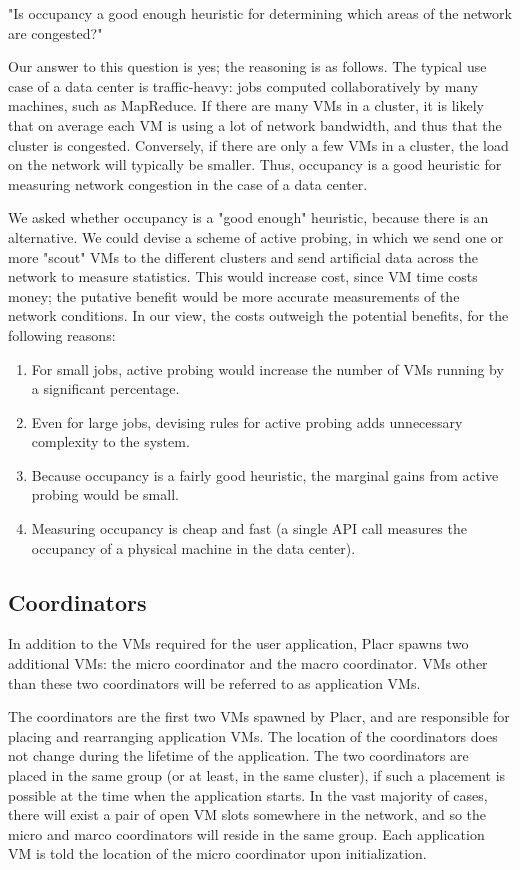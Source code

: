 \documentclass[11pt]{article}
\begin{document}
"Is occupancy a good enough heuristic for determining which areas of the network are congested?"

Our answer to this question is yes; the reasoning is as follows.  The typical use case of a data center is traffic-heavy: jobs computed collaboratively by many machines, such as MapReduce.  If there are many VMs in a cluster, it is likely that on average each VM is using a lot of network bandwidth, and thus that the cluster is congested.  Conversely, if there are only a few VMs in a cluster, the load on the network will typically be smaller.  Thus, occupancy is a good heuristic for measuring network congestion in the case of a data center.

We asked whether occupancy is a "good enough" heuristic, because there is an alternative.  We could devise a scheme of active probing, in which we send one or more "scout" VMs to the different clusters and send artificial data across the network to measure statistics.  This would increase cost, since VM time costs money; the putative benefit would be more accurate measurements of the network conditions.  In our view, the costs outweigh the potential benefits, for the following reasons:

\vspace{-4mm}
\begin{enumerate}
  \item For small jobs, active probing would increase the number of VMs running by a significant percentage.
  \item Even for large jobs, devising rules for active probing adds unnecessary complexity to the system.
  \item  Because occupancy is a fairly good heuristic, the marginal gains from active probing would be small.
  \item Measuring occupancy is cheap and fast (a single API call measures the occupancy of a physical machine in the data center).
\end{enumerate}	


\subsection{Coordinators}

In addition to the VMs required for the user application, Placr spawns two additional VMs: the micro coordinator and the macro coordinator.  VMs other than these two coordinators will be referred to as application VMs.

The coordinators are the first two VMs spawned by Placr, and are responsible for placing and rearranging application VMs.  The location of the coordinators does not change during the lifetime of the application.  The two coordinators are placed in the same group (or at least, in the same cluster), if such a placement is possible at the time when the application starts.  In the vast majority of cases, there will exist a pair of open VM slots somewhere in the network, and so the micro and marco coordinators will reside in the same group.  Each application VM is told the location of the micro coordinator upon initialization.
\end{document}
